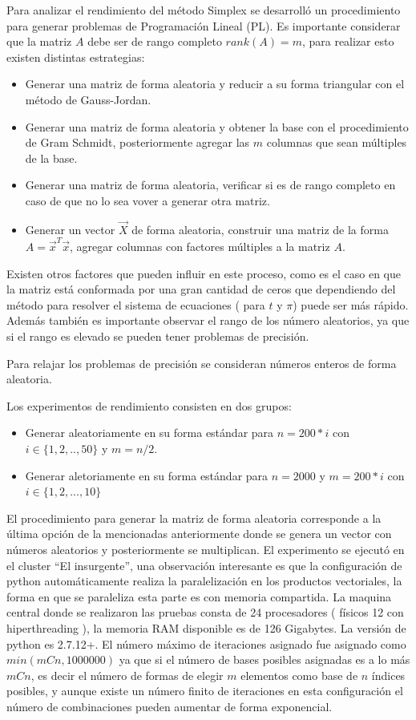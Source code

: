 Para analizar el rendimiento del método Simplex se desarrolló un procedimiento para generar problemas de Programación Lineal (PL).
%
Es importante considerar que la matriz $A$ debe ser de rango completo $rank(A) = m$, para realizar esto existen distintas estrategias:
\begin{itemize}
\item Generar una matriz de forma aleatoria y reducir a su forma triangular con el método de Gauss-Jordan.
\item Generar una matriz de forma aleatoria y obtener la base con el procedimiento de Gram Schmidt, posteriormente agregar las $m$ columnas que sean múltiples de la base.
\item Generar una matriz de forma aleatoria, verificar si es de rango completo en caso de que no lo sea vover a generar otra matriz.
\item Generar un vector $\vec{X}$ de forma aleatoria, construir una matriz de la forma $A = \vec{x}^T \vec{x}$, agregar columnas con factores múltiples a la matriz $A$.
\end{itemize}

Existen otros factores que pueden influir en este proceso, como es el caso en que la matriz está conformada por una gran cantidad de ceros que dependiendo del método para resolver el sistema de ecuaciones ( para $t$ y $\pi$) puede ser más rápido.
%
Además también es importante observar el rango de los número aleatorios, ya que si el rango es elevado se pueden tener problemas de precisión.
%

Para relajar los problemas de precisión se consideran números enteros de forma aleatoria.

Los experimentos de rendimiento consisten en dos grupos:

\begin{itemize}
\item Generar aleatoriamente en su forma estándar para $n=200*i$ con $i \in \{1,2,..,50 \}$ y $m = n/2$.
\item Generar aletoriamente en su forma estándar para $n=2000$ y $m=200*i$ con $i \in \{1,2,...,10\}$
\end{itemize}

El procedimiento para generar la matriz de forma aleatoria corresponde a la última opción de la mencionadas anteriormente donde se genera un vector con números aleatorios y posteriormente se multiplican.
%
El experimento se ejecutó en el cluster ``El insurgente'', una observación interesante es que la configuración de python automáticamente realiza la paralelización en los productos vectoriales, la forma en que se paraleliza esta parte es con memoria compartida.
%
La maquina central donde se realizaron las pruebas consta de 24 procesadores ( físicos 12 con hiperthreading ), la memoria RAM disponible es de 126 Gigabytes.
%
La versión de python es 2.7.12+.
%
El número máximo de iteraciones asignado fue asignado como $min(mCn ,1000000)$ ya que si el número de bases posibles asignadas es a lo más $mCn$, es decir el número de formas de elegir $m$ elementos como base de $n$ índices posibles, y aunque existe un número finito de iteraciones en esta configuración el número de combinaciones pueden aumentar de forma exponencial.


